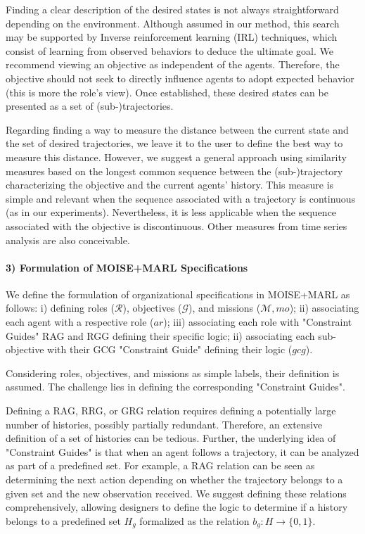 \documentclass[sigconf,anonymous]{aamas}
\begin{document}
Finding a clear description of the desired states is not always straightforward depending on the environment. Although assumed in our method, this search may be supported by Inverse reinforcement learning (IRL) techniques, which consist of learning from observed behaviors to deduce the ultimate goal. We recommend viewing an objective as independent of the agents. Therefore, the objective should not seek to directly influence agents to adopt expected behavior (this is more the role's view). Once established, these desired states can be presented as a set of (sub-)trajectories.

Regarding finding a way to measure the distance between the current state and the set of desired trajectories, we leave it to the user to define the best way to measure this distance. However, we suggest a general approach using similarity measures based on the longest common sequence between the (sub-)trajectory characterizing the objective and the current agents' history. This measure is simple and relevant when the sequence associated with a trajectory is continuous (as in our experiments). Nevertheless, it is less applicable when the sequence associated with the objective is discontinuous. Other measures from time series analysis are also conceivable.

\paragraph{\textbf{3) Formulation of MOISE+MARL Specifications}} \quad

\noindent We define the formulation of organizational specifications in MOISE+MARL as follows: \quad i) defining roles ($\mathcal{R}$), objectives ($\mathcal{G}$), and missions ($\mathcal{M}, mo$); ii) associating each agent with a respective role ($ar$); \quad iii) associating each role with "Constraint Guides" RAG and RGG defining their specific logic; ii) associating each sub-objective with their GCG "Constraint Guide" defining their logic ($gcg$).

Considering roles, objectives, and missions as simple labels, their definition is assumed. The challenge lies in defining the corresponding "Constraint Guides".

Defining a RAG, RRG, or GRG relation requires defining a potentially large number of histories, possibly partially redundant. Therefore, an extensive definition of a set of histories can be tedious. Further, the underlying idea of "Constraint Guides" is that when an agent follows a trajectory, it can be analyzed as part of a predefined set. For example, a RAG relation can be seen as determining the next action depending on whether the trajectory belongs to a given set and the new observation received. We suggest defining these relations comprehensively, allowing designers to define the logic to determine if a history belongs to a predefined set $H_g$ formalized as the relation $b_g: H \to \{0,1\}$.
\end{document}

